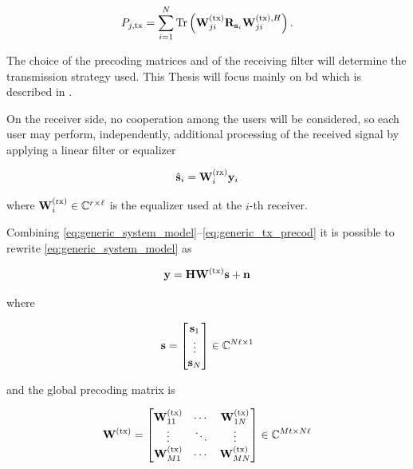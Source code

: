 \begin{equation} \label{eq:bs_precod_power}
    P_{j, \text{tx}} = \sum\limits_{i=1}^{N} \operatorname*{Tr} \left( \mathbf{W}^{(\text{tx})}_{ji} \mathbf{R}_{\mathbf{s}_i}
    \mathbf{W}^{(\text{tx}),H}_{ji} \right).
\end{equation}

The choice of the precoding matrices and of the receiving filter will determine
the transmission strategy used. This Thesis will focus mainly on \gls{bd}
\cite{spencer04} which is described in .

On the receiver side, no cooperation among the users will be considered, so each
user may perform, independently, additional processing of the received signal by
applying a linear filter or equalizer

\begin{equation} \label{eq:generic_rx_eq}
    \hat{\mathbf{s}}_i = \mathbf{W}^{(\text{rx})}_i \mathbf{y}_i
\end{equation}

\noindent
where $\mathbf{W}^{(\text{rx})}_i \in \mathbb{C}^{r \times \ell}$ is the equalizer used at the $i$-th
receiver.

Combining \eqref{eq:generic_system_model}--\eqref{eq:generic_tx_precod} it is
possible to rewrite \eqref{eq:generic_system_model} as

\begin{equation} \label{eq:system_model}
    \mathbf{y} = \mathbf{H} \mathbf{W}^{(\text{tx})} \mathbf{s} + \mathbf{n}
\end{equation}

\noindent
where

\begin{equation} \label{data_symbols}
    \mathbf{s} = \begin{bmatrix}
        \mathbf{s}_1 \\
        \vdots \\
        \mathbf{s}_N
    \end{bmatrix} \in \mathbb{C}^{N\ell \times 1}
\end{equation}

\noindent
and the global precoding matrix is

\begin{equation} \label{eq:precoding_matrix}
    \mathbf{W}^{(\text{tx})} = \begin{bmatrix}
        \mathbf{W}^{(\text{tx})}_{11} & \cdots & \mathbf{W}^{(\text{tx})}_{1N} \\
        \vdots    & \ddots & \vdots \\
        \mathbf{W}^{(\text{tx})}_{M1} & \cdots & \mathbf{W}^{(\text{tx})}_{MN} \\
    \end{bmatrix} \in \mathbb{C}^{Mt \times N\ell}
\end{equation}


